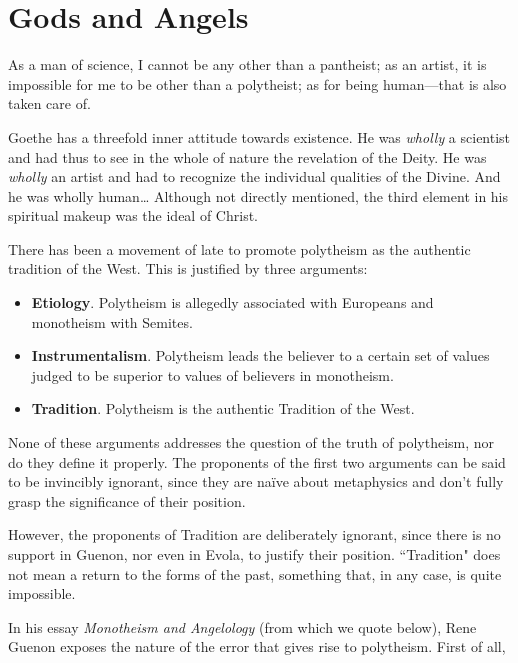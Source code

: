 \section{Gods and Angels}

\begin{quotex}
As a man of science, I cannot be any other than a pantheist; as an artist, it is impossible for me to be other than a polytheist; as for being human—that is also taken care of. 

Goethe has a threefold inner attitude towards existence. He was \emph{wholly} a scientist and had thus to see in the whole of nature the revelation of the Deity. He was \emph{wholly} an artist and had to recognize the individual qualities of the Divine. And he was wholly human… Although not directly mentioned, the third element in his spiritual makeup was the ideal of Christ. 

\end{quotex}
There has been a movement of late to promote polytheism as the authentic tradition of the West. This is justified by three arguments:

\begin{itemize}
\item \textbf{Etiology}. Polytheism is allegedly associated with Europeans and monotheism with Semites. 
\item \textbf{Instrumentalism}. Polytheism leads the believer to a certain set of values judged to be superior to values of believers in monotheism. 
\item \textbf{Tradition}. Polytheism is the authentic Tradition of the West. 
\end{itemize}
None of these arguments addresses the question of the truth of polytheism, nor do they define it properly. The proponents of the first two arguments can be said to be invincibly ignorant, since they are naïve about metaphysics and don't fully grasp the significance of their position.

However, the proponents of Tradition are deliberately ignorant, since there is no support in Guenon, nor even in Evola, to justify their position. ``Tradition" does not mean a return to the forms of the past, something that, in any case, is quite impossible.

In his essay \emph{Monotheism and Angelology} (from which we quote below), Rene Guenon exposes the nature of the error that gives rise to polytheism. First of all, 

